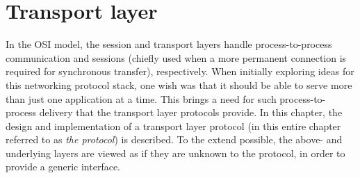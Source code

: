 \chapter{Transport layer}\label{chap:transport}
In the OSI model, the session and transport layers handle process-to-process communication and sessions (chiefly used when a more permanent connection is required for synchronous transfer), respectively. When initially exploring ideas for this networking protocol stack, one wish was that it should be able to serve more than just one application at a time. This brings a need for such process-to-process delivery that the transport layer protocols provide. In this chapter, the design and implementation of a transport layer protocol (in this entire chapter referred to as \textit{the protocol}) is described. To the extend possible, the above- and underlying layers are viewed as if they are unknown to the protocol, in order to provide a generic interface.